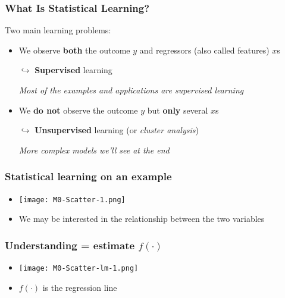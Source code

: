 \documentclass[xcolor=x11names,compress, aspectratio=169]{beamer}
\renewcommand{\(}{\begin{columns}}
\renewcommand{\)}{\end{columns}}
\newcommand{\<}[1]{\begin{column}{#1}}
\renewcommand{\>}{\end{column}}
\begin{document}
\begin{frame} %
\frametitle{What Is Statistical Learning?}
Two main learning problems:
\pause
\begin{itemize}[<+->]
  \item We observe \textbf{both} the outcome $y$ and regressors (also called features) $x$s
   \item[$\hookrightarrow$] \textbf{Supervised} learning
   \item[] \textit{Most of the examples and applications are supervised learning}
   \item We \textbf{do not} observe the outcome $y$ but\textbf{ only} several $x$s
   \item[$\hookrightarrow$] \textbf{Unsupervised} learning (or \textit{cluster analysis})
  \item[] \textit{More complex models we'll see at the end}
 \end{itemize}
\end{frame}



\begin{frame} %
\frametitle{Statistical learning on an example}
 \begin{itemize}
  \item<+->[] \texttt{[image: M0-Scatter-1.png]}
  \item<+->[]  We may be interested in the relationship between the two variables
 \end{itemize}
\end{frame}



\begin{frame} %
\frametitle{Understanding = estimate $f(\cdot)$ }
 \begin{itemize}
  \item<+->[] \texttt{[image: M0-Scatter-lm-1.png]}
  \item<+->[]  $f(\cdot)$ is the regression line
 \end{itemize}
\end{frame}
\end{document}
